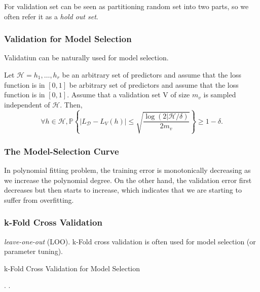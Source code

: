 For validation set can be seen as partitioning random set into two parts, so we often refer it as a \emph{hold out set}.

\subsubsection{Validation for Model Selection}

Validatiun can be naturally used for model selection.

\begin{thm}
	Let $ \mathcal{H} = {h_1, \dots, h_r}  $ be an arbitrary set of predictors and assume that the loss function is in $ [0, 1]  $ 
	be arbitrary set of predictors and assume that the loss function is in $ [0, 1]  $. Assume that a validation set V of size $ m_v $ 
	is sampled independent of $ \mathcal{H} $. Then, 
	\[ \forall h\in\mathcal{H}, \mathbb{P} \left\{ |L_\mathcal{D} - L_V(h)| \le 
	\sqrt {\frac{\log(2|\mathcal{H}/\delta)}{2m_v}}  \right\} \ge 1-\delta.\]
\end{thm}

\subsubsection{The Model-Selection Curve}

In polynomial fitting problem, the training error is monotonically decreasing as we increase the polynomial degree.
On the other hand, the validation error first decreases but then starts to increase, 
which indicates that we are starting to suffer from overfitting.

\subsubsection{k-Fold Cross Validation}

\emph{leave-one-out} (LOO).
k-Fold cross validation is often used for model selection (or parameter tuning).

\begin{algorithm}[h!]
	\caption{k-Fold Cross Validation for Model Selection} 
	\begin{algorithmic}
		\For{$ \theta \in \Theta $ }
			\EndFor.
		\EndFor.
	\end{algorithmic}
\end{algorithm}

